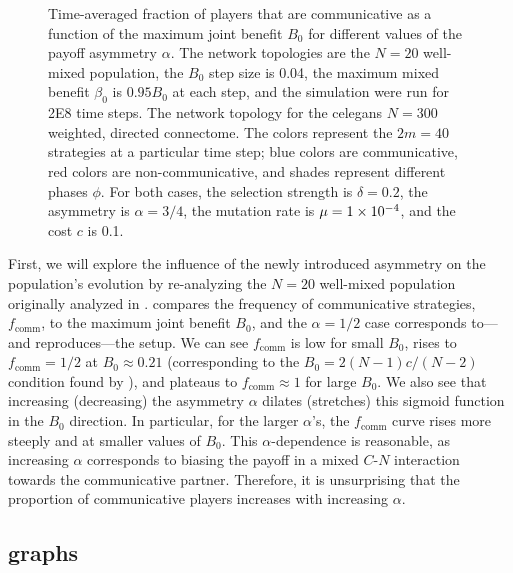 \documentclass[pdflatex,lineno,referee,sn-mathphys-ay]{sn-jnl}
\begin{document}
\begin{figure}
  \centering
  
  \caption{
    Time-averaged fraction of players that are communicative as a function
    of the maximum joint benefit $B_0$
    for different values of the payoff asymmetry $\alpha$.
    The network topologies are the
    $N=20$ well-mixed population,
    the $B_0$ step size is \num{0.04},
    the maximum mixed benefit $\beta_0$ is $\num{0.95} B_0$ at each step,
    and the simulation were run for \num{2E8} time steps.
    The network topology for the \gls{celegans}
    $N=300$ weighted, directed connectome.
    The colors represent the $2m = 40$ strategies
    at a particular time step;
    blue colors are communicative,
    red colors are non-communicative,
    and shades represent different phases $\phi$.
    For both cases,
    the selection strength is $\delta=0.2$,
    the asymmetry is $\alpha=3/4$,
    the mutation rate is $\mu=\num{1E-4}$,
    and
    the cost $c$ is \num{0.1}.
  }
  \label{fig:graph_multi-comm-frac}
\end{figure}

First, we will explore the influence of the newly introduced asymmetry
on the population's evolution by
re-analyzing the $N=20$ well-mixed population
originally analyzed in \citet{tripp2022evolutionary}.
 compares the frequency of communicative strategies,
$f_{\text{comm}}$, to the maximum joint benefit $B_0$,
and the $\alpha=1/2$ case corresponds to---and reproduces---the
\citet{tripp2022evolutionary} setup.
We can see $f_{\text{comm}}$ is low for small $B_0$,
rises to $f_{\text{comm}} = 1/2$ at $B_0 \approx 0.21$
(corresponding to the $B_0 = 2 (N-1) c/(N-2)$ condition
found by \citet{tripp2022evolutionary}),
and plateaus to $f_{\text{comm}} \approx 1$ for large $B_0$.
We also see that increasing (decreasing)
the asymmetry $\alpha$ dilates (stretches) this sigmoid function
in the $B_0$ direction.
In particular, for the larger $\alpha$'s, the $f_{\text{comm}}$ curve
rises more steeply and at smaller values of $B_0$.
This $\alpha$-dependence is reasonable,
as increasing $\alpha$ corresponds to biasing the payoff
in a mixed $C$-$N$ interaction towards the communicative partner.
Therefore, it is unsurprising that the proportion of communicative players
increases with increasing $\alpha$.

\subsection{ graphs}
\label{sec:elegans_graph}
\end{document}
